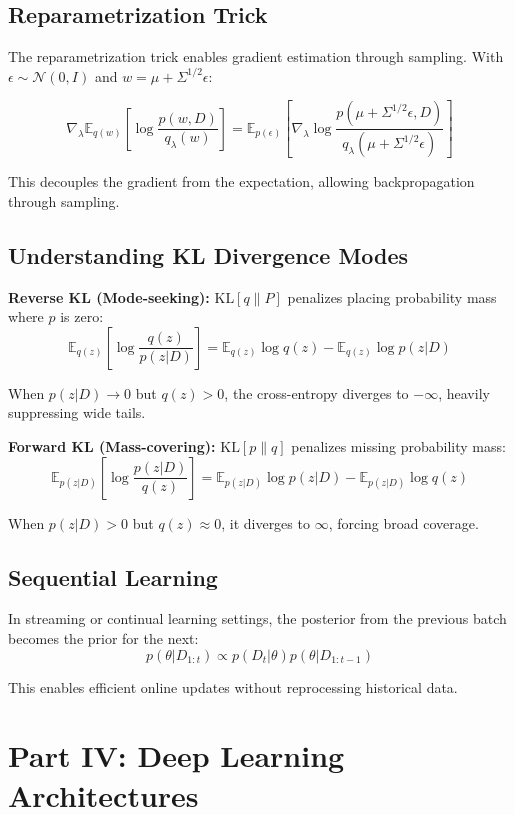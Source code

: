\documentclass[12pt,a4paper]{article}
\theoremstyle{definition}
\begin{document}
\subsection{Reparametrization Trick}

The reparametrization trick enables gradient estimation through sampling. With $\epsilon \sim \mathcal{N}(0, I)$ and $w = \mu + \Sigma^{1/2} \epsilon$:

\[
\nabla_\lambda \mathbb{E}_{q(w)} \left[\log \frac{p(w,D)}{q_\lambda(w)}\right] = \mathbb{E}_{p(\epsilon)} \left[\nabla_\lambda \log \frac{p(\mu + \Sigma^{1/2}\epsilon, D)}{q_\lambda(\mu + \Sigma^{1/2}\epsilon)}\right]
\]

This decouples the gradient from the expectation, allowing backpropagation through sampling.

\subsection{Understanding KL Divergence Modes}

\textbf{Reverse KL (Mode-seeking):} $\mathrm{KL}[q \| P]$ penalizes placing probability mass where $p$ is zero:
\[
\mathbb{E}_{q(z)} \left[\log \frac{q(z)}{p(z|D)}\right] = \mathbb{E}_{q(z)} \log q(z) - \mathbb{E}_{q(z)} \log p(z|D)
\]

When $p(z|D) \to 0$ but $q(z) > 0$, the cross-entropy diverges to $-\infty$, heavily suppressing wide tails.

\textbf{Forward KL (Mass-covering):} $\mathrm{KL}[p \| q]$ penalizes missing probability mass:
\[
\mathbb{E}_{p(z|D)} \left[\log \frac{p(z|D)}{q(z)}\right] = \mathbb{E}_{p(z|D)} \log p(z|D) - \mathbb{E}_{p(z|D)} \log q(z)
\]

When $p(z|D) > 0$ but $q(z) \approx 0$, it diverges to $\infty$, forcing broad coverage.

\subsection{Sequential Learning}

In streaming or continual learning settings, the posterior from the previous batch becomes the prior for the next:
\[
p(\theta | D_{1:t}) \propto p(D_t | \theta) p(\theta | D_{1:t-1})
\]

This enables efficient online updates without reprocessing historical data.

\newpage

\section{Part IV: Deep Learning Architectures}
\end{document}
